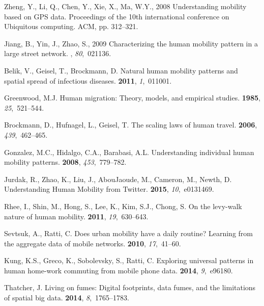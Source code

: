 \documentclass{elsart}
\begin{document}
\begin{thebibliography}{00}
Zheng, Y., Li, Q., Chen, Y., Xie, X., Ma, W.Y., 2008
\newblock Understanding mobility based on GPS data.
\newblock  Proceedings of the 10th international conference on Ubiquitous
  computing. ACM, pp. 312--321.

Jiang, B., Yin, J., Zhao, S., 2009
\newblock Characterizing the human mobility pattern in a large street network.
, {\em 80},~021136.

Belik, V., Geisel, T., Brockmann, D.
\newblock Natural human mobility patterns and spatial spread of infectious
  diseases.
 {\bf 2011}, {\em 1},~011001.

Greenwood, M.J.
\newblock Human migration: Theory, models, and empirical studies.
 {\bf 1985}, {\em 25},~521--544.

Brockmann, D., Hufnagel, L., Geisel, T.
\newblock The scaling laws of human travel.
 {\bf 2006}, {\em 439},~462--465.

Gonzalez, M.C., Hidalgo, C.A., Barabasi, A.L.
\newblock Understanding individual human mobility patterns.
 {\bf 2008}, {\em 453},~779--782.

Jurdak, R., Zhao, K., Liu, J., AbouJaoude, M., Cameron, M., Newth, D.
\newblock Understanding Human Mobility from Twitter.
 {\bf 2015}, {\em 10},~e0131469.

Rhee, I., Shin, M., Hong, S., Lee, K., Kim, S.J., Chong, S.
\newblock On the levy-walk nature of human mobility.
 {\bf 2011}, {\em
  19},~630--643.

Sevtsuk, A., Ratti, C.
\newblock Does urban mobility have a daily routine? Learning from the aggregate
  data of mobile networks.
 {\bf 2010}, {\em 17},~41--60.

Kung, K.S., Greco, K., Sobolevsky, S., Ratti, C.
\newblock Exploring universal patterns in human home-work commuting from mobile
  phone data.
 {\bf 2014}, {\em 9},~e96180.

Thatcher, J.
\newblock Living on fumes: Digital footprints, data fumes, and the limitations
  of spatial big data.
 {\bf 2014}, {\em
  8},~1765--1783.


\end{thebibliography}
\end{document}
